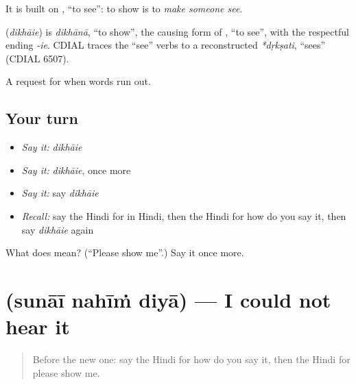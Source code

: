 It is built on \textbf{}, \textquotedblleft{}to see\textquotedblright{}: to show is to \emph{make someone see}.

\begin{cousinweb}
\textbf{} (\emph{dikhāie}) is \emph{dikhānā}, \textquotedblleft{}to show\textquotedblright{}, the causing form of \textbf{}, \textquotedblleft{}to see\textquotedblright{}, with the respectful ending \emph{-ie}. CDIAL traces the \textquotedblleft{}see\textquotedblright{} verbs to a reconstructed \emph{*dṛkṣati}, \textquotedblleft{}sees\textquotedblright{} (CDIAL 6507).
\end{cousinweb}

\begin{grammarlens}[title={What you've built}]
A request for when words run out.
\end{grammarlens}

\subsection*{Your turn}
\begin{itemize}
\raggedright
  \item \emph{Say it:} \emph{dikhāie}
  \item \emph{Say it:} \emph{dikhāie}, once more
  \item \emph{Say it:} say \emph{dikhāie}
  \item \emph{Recall:} say the Hindi for in Hindi, then the Hindi for how do you say it, then say \emph{dikhāie} again
\end{itemize}

\begin{tcolorbox}[breakable,colback=teal!4,colframe=teal!35!black,title={Before you move on}]
What does  mean? (\textquotedblleft{}Please show me\textquotedblright{}.) Say it once more.
\end{tcolorbox}
\section[\texorpdfstring{\hi{सुनाई} \hi{नहीं} \hi{दिया} (sunāī nahīṁ diyā)}{सुनाई नहीं दिया (sunāī nahīṁ diyā)}]{   (sunāī nahīṁ diyā) — I could not hear it}

\label{lesson:HI-C111-sunai}



\begin{quote}
Before the new one: say the Hindi for how do you say it, then the Hindi for please show me.
\end{quote}

